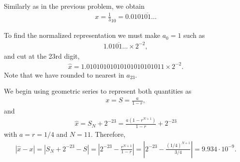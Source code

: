 \begin{questions}

\begin{solution}
Similarly as in the previous problem, we obtain
\begin{align*}
x=\frac{1}{3}_{10}=0.0101\overline{01}\dots
\end{align*}
\end{solution}
\begin{solution}
To find the normalized representation we must make $a_0=1$ such as
\begin{align*}
1.01\overline{01}\dots\times 2^{-2},
\end{align*}
and cut at the 23rd digit,
\begin{align*}
\hat{x}=1.01010101010101010101011\times 2^{-2}.
\end{align*}
Note that we have rounded to nearest in $a_{23}$.
\end{solution}
\begin{solution}
We begin using geometric series to represent both quantities as
\begin{align*}
x=S=\frac{a}{1-r},
\end{align*}
and
\begin{align*}
\hat{x}=S_N+2^{-23}=\frac{a(1-r^{N+1})}{1-r}+2^{-23}
\end{align*}
with $a=r=1/4$ and $N=11$. Therefore,
\begin{align*}
|\hat{x}-x|=|S_N+2^{-23}-S|=\left|2^{-23}-\frac{r^{N+1}}{1-r}\right|=\left|2^{-23}-\frac{(1/4)^{N+1}}{3/4}\right|=9.934\cdot 10^{-9}.
\end{align*}
\end{solution}
\end{questions}
